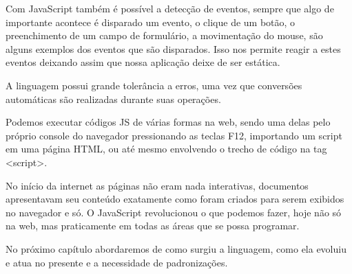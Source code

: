 \documentclass[
	12pt,				%
	openright,			%
	twoside,			%
	a4paper,			%
	english,			%
	brazil				%
	]{abntex2}
\begin{document}
Com JavaScript também é possível a detecção de eventos, sempre que algo de importante acontece é disparado um evento, o clique de um botão, o preenchimento de um campo de formulário, a movimentação do mouse, são alguns exemplos dos eventos que são disparados. Isso nos permite reagir a estes eventos deixando assim que nossa aplicação deixe de ser estática.

A linguagem possui grande tolerância a erros, uma vez que conversões automáticas são realizadas durante suas operações.

Podemos executar códigos JS de várias formas na web, sendo uma delas pelo próprio console do navegador pressionando as teclas F12, importando um script em uma página HTML, ou até mesmo envolvendo o trecho de código na tag <script>.

No início da internet as páginas não eram nada interativas, documentos apresentavam seu conteúdo exatamente como foram criados para serem exibidos no navegador e só. O JavaScript revolucionou o que podemos fazer, hoje não só na web, mas praticamente em todas as áreas que se possa programar. 

No próximo capítulo abordaremos de como surgiu a linguagem, como ela evoluiu e atua no presente e a necessidade de padronizações.
\end{document}
